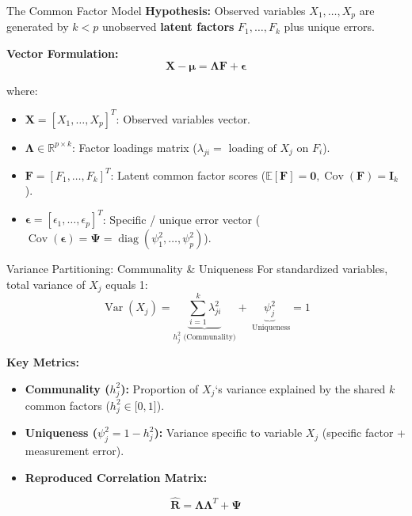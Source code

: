 \documentclass[aspectratio=169,ignorenonframetext]{beamer}
\begin{document}
\begin{frame}{The Common Factor Model}
\textbf{Hypothesis:} Observed variables \(X_{1},\ldots,X_{p}\) are
generated by \(k < p\) unobserved \textbf{latent factors}
\(F_{1},\ldots,F_{k}\) plus unique errors.

\textbf{Vector Formulation:}
\[\mathbf{X} - \mathbf{\mu} = \mathbf{\Lambda}\mathbf{F} + \mathbf{\epsilon}\]

where:

\begin{itemize}
\item
  \(\mathbf{X} = \left\lbrack X_{1},\ldots,X_{p} \right\rbrack^{T}\):
  Observed variables vector.
\item
  \(\mathbf{\Lambda} \in \mathbb{R}^{p \times k}\): Factor loadings
  matrix
  (\(\lambda_{ji} = \text{ loading of  }X_{j}\text{  on  }F_{i}\)).
\item
  \(\mathbf{F} = \left\lbrack F_{1},\ldots,F_{k} \right\rbrack^{T}\):
  Latent common factor scores
  (\(\mathbb{E}\left\lbrack \mathbf{F} \right\rbrack = \mathbf{0},\operatorname{Cov}(\mathbf{F}) = \mathbf{I}_{k}\)).
\item
  \(\mathbf{\epsilon} = \left\lbrack \epsilon_{1},\ldots,\epsilon_{p} \right\rbrack^{T}\):
  Specific / unique error vector
  (\(\operatorname{Cov}(\mathbf{\epsilon}) = \mathbf{\Psi} = \operatorname{diag}(\psi_{1}^{2},\ldots,\psi_{p}^{2})\)).
\end{itemize}
\end{frame}

\begin{frame}[shrink]{Variance Partitioning: Communality \& Uniqueness}
For standardized variables, total variance of \(X_{j}\) equals 1:
\[\operatorname{Var}(X_{j}) = \underset{h_{j}^{2}\text{  (Communality)}}{\underbrace{\sum_{i = 1}^{k}\lambda_{ji}^{2}}} + \underset{\text{ Uniqueness}}{\underbrace{\psi_{j}^{2}}} = 1\]

\textbf{Key Metrics:}

\begin{itemize}
\item
  \textbf{Communality (\(h_{j}^{2}\)):} Proportion of \(X_{j}\)`s
  variance explained by the shared \(k\) common factors
  (\(h_{j}^{2} \in \lbrack 0,1\rbrack\)).
\item
  \textbf{Uniqueness (\(\psi_{j}^{2} = 1 - h_{j}^{2}\)):} Variance
  specific to variable \(X_{j}\) (specific factor + measurement error).
\item
  \textbf{Reproduced Correlation Matrix:}
\end{itemize}

\[\hat{\mathbf{R}} = \mathbf{\Lambda}\mathbf{\Lambda}^{T} + \mathbf{\Psi}\]
\end{frame}
\end{document}
